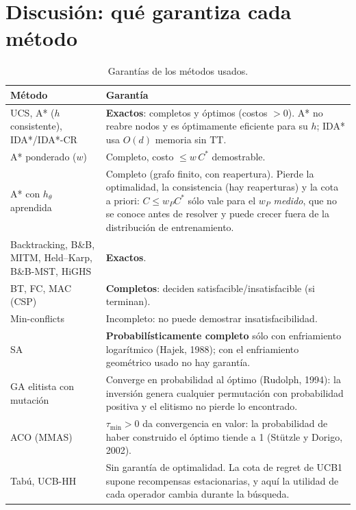 \documentclass[11pt]{article}
\theoremstyle{remark}
\begin{document}
\section{Discusión: qué garantiza cada método}

\begin{table}[H]
\centering\small
\caption{Garantías de los métodos usados.}\label{tab:garantias}
\begin{tabular}{p{4.2cm}p{11.3cm}}
\toprule
Método & Garantía \\
\midrule
UCS, A* ($h$ consistente), IDA*/IDA*-CR & \textbf{Exactos}: completos y óptimos (costos $>0$). A* no
reabre nodos y es óptimamente eficiente para su $h$; IDA* usa $O(d)$ memoria sin TT. \\
A* ponderado ($w$) & Completo, costo $\le w\,C^*$ demostrable. \\
A* con $h_\theta$ aprendida & Completo (grafo finito, con reapertura). Pierde la optimalidad, la
consistencia (hay reaperturas) y la cota a priori: $C\le w_PC^*$ sólo vale para el $w_P$
\emph{medido}, que no se conoce antes de resolver y puede crecer fuera de la distribución de
entrenamiento. \\
Backtracking, B\&B, MITM, Held--Karp, B\&B-MST, HiGHS & \textbf{Exactos}. \\
BT, FC, MAC (CSP) & \textbf{Completos}: deciden satisfacible/insatisfacible (si terminan). \\
Min-conflicts & Incompleto: no puede demostrar insatisfacibilidad. \\
SA & \textbf{Probabilísticamente completo} sólo con enfriamiento logarítmico (Hajek, 1988); con el
enfriamiento geométrico usado no hay garantía. \\
GA elitista con mutación & Converge en probabilidad al óptimo (Rudolph, 1994): la inversión genera
cualquier permutación con probabilidad positiva y el elitismo no pierde lo encontrado. \\
ACO (MMAS) & $\tau_{\min}>0$ da convergencia en valor: la probabilidad de haber construido el óptimo
tiende a 1 (Stützle y Dorigo, 2002). \\
Tabú, UCB-HH & Sin garantía de optimalidad. La cota de regret de UCB1 supone recompensas
estacionarias, y aquí la utilidad de cada operador cambia durante la búsqueda. \\
\bottomrule
\end{tabular}
\end{table}
\end{document}
